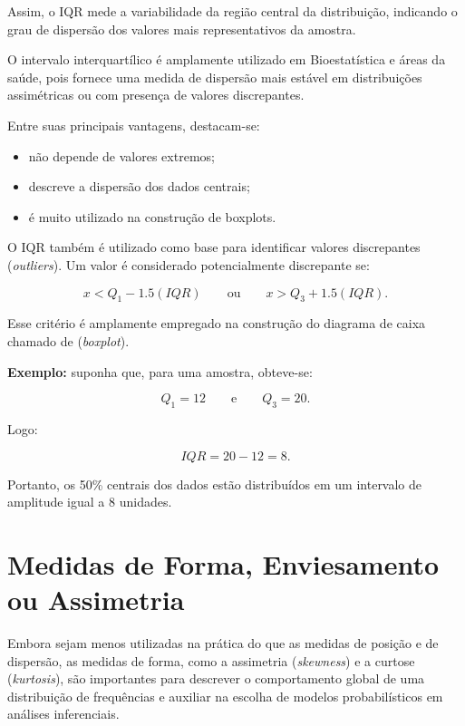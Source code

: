 Assim, o IQR mede a variabilidade da região central da distribuição, indicando
o grau de dispersão dos valores mais representativos da amostra. \vskip0.3cm

O intervalo interquartílico é amplamente utilizado em Bioestatística e áreas
da saúde, pois fornece uma medida de dispersão mais estável em distribuições
assimétricas ou com presença de valores discrepantes. \vskip0.3cm

Entre suas principais vantagens, destacam-se:

\begin{itemize}
    \item não depende de valores extremos;
    \item descreve a dispersão dos dados centrais;
    \item é muito utilizado na construção de boxplots.
\end{itemize}


O IQR também é utilizado como base para identificar valores discrepantes
(\textit{outliers}). Um valor é considerado potencialmente discrepante se:

\begin{equation}
x < Q_1 - 1.5(IQR)
\qquad \text{ou} \qquad
x > Q_3 + 1.5(IQR).
\end{equation}

Esse critério é amplamente empregado na construção do diagrama de caixa chamado de 
(\textit{boxplot}).   \vskip0.3cm

\textbf{Exemplo:} suponha que, para uma amostra, obteve-se:

\[
Q_1 = 12
\qquad \text{e} \qquad
Q_3 = 20.
\]

Logo:

\[
IQR = 20 - 12 = 8.
\]

Portanto, os 50\% centrais dos dados estão distribuídos em um intervalo de
amplitude igual a 8 unidades.


\newpage
\section{Medidas de Forma, Enviesamento ou Assimetria }

Embora sejam menos utilizadas na prática do que as medidas de posição e de
dispersão, as medidas de forma, como a assimetria (\textit{skewness}) e a
curtose (\textit{kurtosis}), são importantes para descrever o comportamento
global de uma distribuição de frequências e auxiliar na escolha de modelos
probabilísticos em análises inferenciais. \vskip0.3cm

